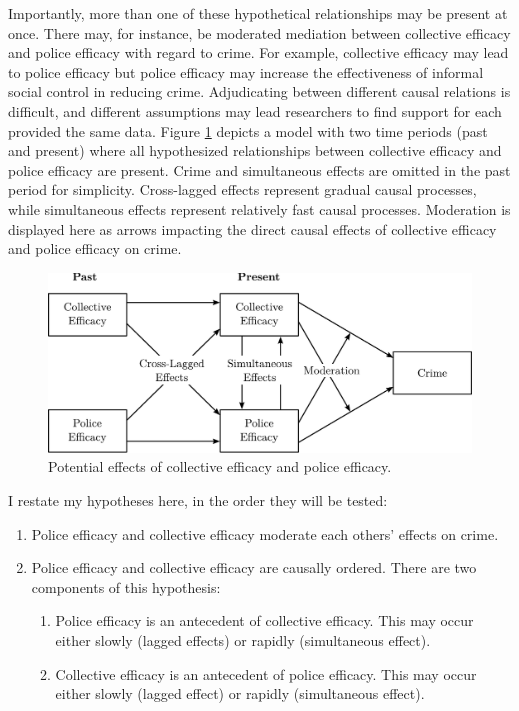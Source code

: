 \documentclass [11pt, proquest] {uwthesis}[2015/03/03]
\providecommand{\tightlist}{%
  \setlength{\itemsep}{0pt}\setlength{\parskip}{0pt}}
\begin{document}
Importantly, more than one of these hypothetical relationships may be present at once. There may, for instance, be moderated mediation between collective efficacy and police efficacy with regard to crime. For example, collective efficacy may lead to police efficacy but police efficacy may increase the effectiveness of informal social control in reducing crime. Adjudicating between different causal relations is difficult, and different assumptions may lead researchers to find support for each provided the same data. Figure \ref{fig:fclongitudinalmodel} depicts a model with two time periods (past and present) where all hypothesized relationships between collective efficacy and police efficacy are present. Crime and simultaneous effects are omitted in the past period for simplicity. Cross-lagged effects represent gradual causal processes, while simultaneous effects represent relatively fast causal processes. Moderation is displayed here as arrows impacting the direct causal effects of collective efficacy and police efficacy on crime.\linebreak
\linebreak
\begin{figure}

{\centering \includegraphics[width=0.9\linewidth]{./figure/ch3/longitudinal_model} 

}

\caption{Potential effects of collective efficacy and police efficacy.}\label{fig:fclongitudinalmodel}
\end{figure}
I restate my hypotheses here, in the order they will be tested:
\begin{enumerate}
\def\labelenumi{\arabic{enumi}.}
\tightlist
\item
  Police efficacy and collective efficacy moderate each others' effects on crime.
\item
  Police efficacy and collective efficacy are causally ordered. There are two components of this hypothesis:
  \begin{enumerate}
  \def\labelenumii{\alph{enumii}.}
  \tightlist
  \item
    Police efficacy is an antecedent of collective efficacy. This may occur either slowly (lagged effects) or rapidly (simultaneous effect).
  \item
    Collective efficacy is an antecedent of police efficacy. This may occur either slowly (lagged effect) or rapidly (simultaneous effect).
  \end{enumerate}
\end{enumerate}
\end{document}
